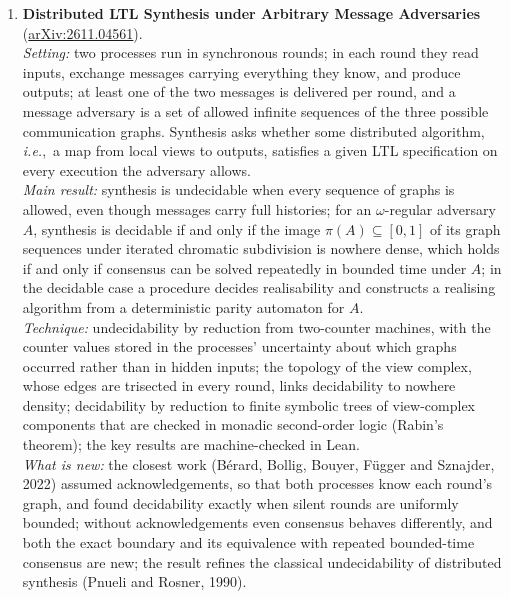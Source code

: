 \documentclass[11pt,a4paper]{article}
\newcommand{\ie}{\emph{i.e.},\ }
\begin{document}
\begin{enumerate}[leftmargin=*]
  \emph{Limitations:} the authors do not know whether the result holds for four or more players without the richness condition; discrete time only (three-player games in continuous time can lack approximate equilibria); the proof is purely existential and long; the fetched text ended in Section 4, so the proof of the three-player theorem and the discussion were not read.\\
  \emph{Verdict:} settles a known open problem on sequential decisions, completely for three players and for any number of players under a mild richness condition, with a genuinely new idea; confidence high (full text up to Section 4).
  \item \textbf{Distributed LTL Synthesis under Arbitrary Message Adversaries}~\cite{bollig2026distributed} (\href{https://arxiv.org/abs/2611.04561}{arXiv:2611.04561}).\\
  \emph{Setting:} two processes run in synchronous rounds; in each round they read inputs, exchange messages carrying everything they know, and produce outputs; at least one of the two messages is delivered per round, and a message adversary is a set of allowed infinite sequences of the three possible communication graphs. Synthesis asks whether some distributed algorithm, \ie a map from local views to outputs, satisfies a given \ac{LTL} specification on every execution the adversary allows.\\
  \emph{Main result:} synthesis is undecidable when every sequence of graphs is allowed, even though messages carry full histories; for an $\omega$-regular adversary $A$, synthesis is decidable if and only if the image $\pi(A) \subseteq [0,1]$ of its graph sequences under iterated chromatic subdivision is nowhere dense, which holds if and only if consensus can be solved repeatedly in bounded time under $A$; in the decidable case a procedure decides realisability and constructs a realising algorithm from a deterministic parity automaton for $A$.\\
  \emph{Technique:} undecidability by reduction from two-counter machines, with the counter values stored in the processes' uncertainty about which graphs occurred rather than in hidden inputs; the topology of the view complex, whose edges are trisected in every round, links decidability to nowhere density; decidability by reduction to finite symbolic trees of view-complex components that are checked in monadic second-order logic (Rabin's theorem); the key results are machine-checked in Lean.\\
  \emph{What is new:} the closest work (B{\'e}rard, Bollig, Bouyer, F{\"u}gger and Sznajder, 2022) assumed acknowledgements, so that both processes know each round's graph, and found decidability exactly when silent rounds are uniformly bounded; without acknowledgements even consensus behaves differently, and both the exact boundary and its equivalence with repeated bounded-time consensus are new; the result refines the classical undecidability of distributed synthesis (Pnueli and Rosner, 1990).\\

\end{enumerate}
\end{document}

